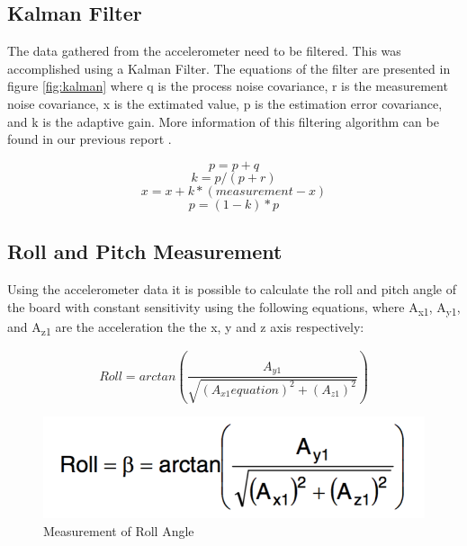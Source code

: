 ﻿\documentclass[12pt]{article}
\begin{document}
\subsection{Kalman Filter}
The data gathered from the accelerometer need to be filtered. This was accomplished using a Kalman Filter. The equations of the filter are presented in figure \ref{fig:kalman} where q is the process noise covariance, r is the measurement noise covariance, x is the extimated value, p is the estimation error covariance, and k is the adaptive gain. More information of this filtering algorithm can be found in our previous report \cite{Lab2report}.

\begin{equation}
p=p+q
\end{equation}
\begin{equation}
k=p/(p+r)
\end{equation}
\begin{equation}
x=x+k*(measurement-x)
\end{equation}
\begin{equation}
p=(1-k)*p
\end{equation}

\subsection{Roll and Pitch Measurement}
Using the accelerometer data it is possible to calculate the roll and pitch angle of the board with constant sensitivity using the following equations, where A\textsubscript{x1}, A\textsubscript{y1}, and A\textsubscript{z1} are the acceleration the the x, y and z axis respectively:

\begin{equation}
Roll=arctan(\frac{A_{y1}}{\sqrt{(A_{x1}equation)^2+(A_{z1})^2}})
\end{equation}

\begin{figure}[!htb]
 \centering
 \includegraphics[scale=0.50]{images/roll.png}
 \caption{Measurement of Roll Angle}
 \label{fig:roll}
\end{figure}
\end{document}
